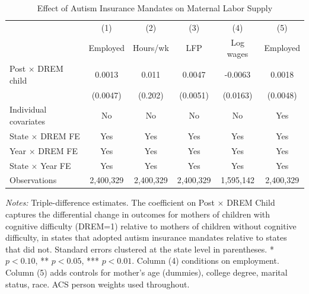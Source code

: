 \begin{table}[H]
\centering
\caption{Effect of Autism Insurance Mandates on Maternal Labor Supply}
\begin{threeparttable}
\begin{tabular}{lccccc}
\toprule
 & (1) & (2) & (3) & (4) & (5) \\
 & Employed & Hours/wk & LFP & Log wages & Employed \\
\midrule
Post $\times$ DREM child & 0.0013 & 0.011 & 0.0047 & -0.0063 & 0.0018 \\
 & (0.0047) & (0.202) & (0.0051) & (0.0163) & (0.0048) \\
\midrule
Individual covariates & No & No & No & No & Yes \\
State $\times$ DREM FE & Yes & Yes & Yes & Yes & Yes \\
Year $\times$ DREM FE & Yes & Yes & Yes & Yes & Yes \\
State $\times$ Year FE & Yes & Yes & Yes & Yes & Yes \\
Observations & 2,400,329 & 2,400,329 & 2,400,329 & 1,595,142 & 2,400,329 \\
\bottomrule
\end{tabular}
\begin{tablenotes}[flushleft]
\small
\item \textit{Notes:} Triple-difference estimates. The coefficient on Post $\times$ DREM Child captures the differential change in outcomes for mothers of children with cognitive difficulty (DREM=1) relative to mothers of children without cognitive difficulty, in states that adopted autism insurance mandates relative to states that did not. Standard errors clustered at the state level in parentheses. * $p<0.10$, ** $p<0.05$, *** $p<0.01$. Column (4) conditions on employment. Column (5) adds controls for mother's age (dummies), college degree, marital status, race. ACS person weights used throughout.
\end{tablenotes}
\end{threeparttable}
\label{tab:main}
\end{table}

